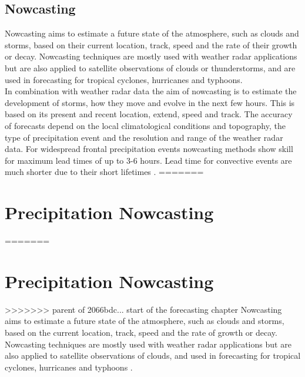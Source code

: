 \documentclass[11pt,twoside,a4paper,fleqn,x11names]{report}
\numberwithin{equation}{chapter}
\numberwithin{figure}{chapter}
\numberwithin{table}{chapter}
\begin{document}
\section{Nowcasting}
\label{chap:nowcasting}
Nowcasting aims to estimate a future state of the atmosphere, such as clouds and storms, based on their current location, track, speed and the rate of their growth or decay. Nowcasting techniques are mostly used with weather radar applications but are also applied to satellite observations of clouds or thunderstorms, and are used in forecasting for tropical cyclones, hurricanes and typhoons.\\
In combination with weather radar data the aim of nowcasting is to estimate the development of storms, how they move and evolve in the next few hours. This is based on its present and recent location, extend, speed and track. The accuracy of forecasts depend on the local climatological conditions and topography, the type of precipitation event and the resolution and range of the weather radar data. For widespread frontal precipitation events nowcasting methods show skill for maximum lead times of up to 3-6 hours. Lead time for convective events are much shorter due to their short lifetimes \citep{Sene2009}.
=======
\chapter{Precipitation Nowcasting}
\label{chap:nowcasting}
=======
\chapter{Precipitation Nowcasting}
\label{chap:nowcasting}
>>>>>>> parent of 2066bdc... start of the forecasting chapter
Nowcasting aims to estimate a future state of the atmosphere, such as clouds and storms, based on the current location, track, speed and the rate of growth or decay. Nowcasting techniques are mostly used with weather radar applications but are also applied to satellite observations of clouds, and used in forecasting for tropical cyclones, hurricanes and typhoons \citep{Sene2009}.
\end{document}
